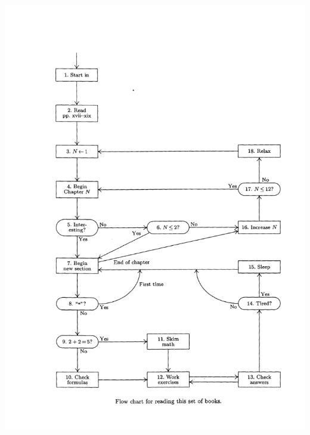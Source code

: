 \documentclass{article}
\begin{document}
\includegraphics[width=0.9\linewidth]{./figs/fig_flowchart_for_reading_this_set_book.png}
\end{document}

